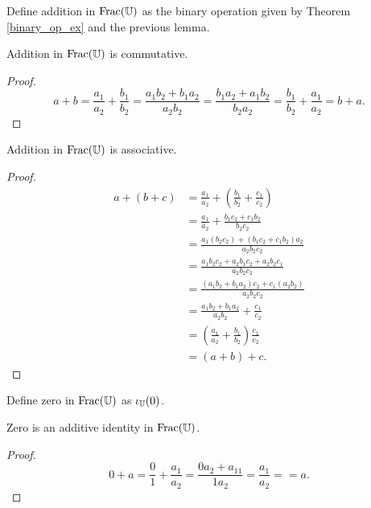 \documentclass[../../math.tex]{subfiles}
\begin{document}
\begin{instance}
    Define addition in $\operatorname{Frac}(\mathbb{U})$ as the binary operation given by Theorem
    \ref{binary_op_ex} and the previous lemma.
\end{instance}

\begin{instance}
    Addition in $\operatorname{Frac}(\mathbb{U})$ is commutative.
\end{instance}
\begin{proof}
    \[
        a + b
        = \frac{a_1}{a_2} + \frac{b_1}{b_2}
        = \frac{a_1b_2 + b_1a_2}{a_2b_2}
        = \frac{b_1a_2 + a_1b_2}{b_2a_2}
        = \frac{b_1}{b_2} + \frac{a_1}{a_2}
        = b + a.
    \]
\end{proof}

\begin{instance}
    Addition in $\operatorname{Frac}(\mathbb{U})$ is associative.
\end{instance}
\begin{proof}
    \begin{align*}
        a + (b + c)
        &= \frac{a_1}{a_2} + \left( \frac{b_1}{b_2} + \frac{c_1}{c_2} \right) \\
        &= \frac{a_1}{a_2} + \frac{b_1c_2 + c_1b_2}{b_2c_2} \\
        &= \frac{a_1(b_2c_2) + (b_1c_2 + c_1b_2)a_2}{a_2b_2c_2} \\
        &= \frac{a_1b_2c_2 + a_2b_1c_2 + a_2b_2c_1}{a_2b_2c_2} \\
        &= \frac{(a_1b_2 + b_1a_2)c_2 + c_1(a_2b_2)}{a_2b_2c_2} \\
        &= \frac{a_1b_2 + b_1a_2}{a_2b_2} + \frac{c_1}{c_2} \\
        &= \left( \frac{a_1}{a_2} + \frac{b_1}{b_2} \right) \frac{c_1}{c_2} \\
        &= (a + b) + c.
    \end{align*}
\end{proof}

\begin{instance}
    Define zero in $\operatorname{Frac}(\mathbb{U})$ as $\iota_{\mathbb{U}}(0)$.
\end{instance}

\begin{instance}
    Zero is an additive identity in $\operatorname{Frac}(\mathbb{U})$.
\end{instance}
\begin{proof}
    \[
        0 + a =
        \frac{0}{1} + \frac{a_1}{a_2} =
        \frac{0a_2 + a_11}{1a_2} =
        \frac{a_1}{a_2} =
        = a.
    \]
\end{proof}
\end{document}
